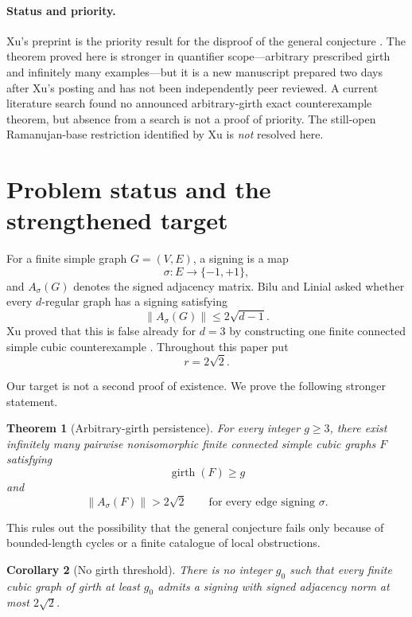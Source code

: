 \documentclass[11pt]{article}
\newtheorem{theorem}{Theorem}[section]
\newtheorem{corollary}[theorem]{Corollary}
\newcommand{\sgn}{\sigma}
\newcommand{\norm}[1]{\left\lVert #1\right\rVert}
\begin{document}
\paragraph{Status and priority.}
Xu's preprint is the priority result for the disproof of the general conjecture \cite{Xu2026}.  The theorem proved here is stronger in quantifier scope---arbitrary prescribed girth and infinitely many examples---but it is a new manuscript prepared two days after Xu's posting and has not been independently peer reviewed.  A current literature search found no announced arbitrary-girth exact counterexample theorem, but absence from a search is not a proof of priority.  The still-open Ramanujan-base restriction identified by Xu is \emph{not} resolved here.

\tableofcontents
\bigskip

\section{Problem status and the strengthened target}

For a finite simple graph $G=(V,E)$, a signing is a map
\[
 \sgn:E\to\{-1,+1\},
\]
and $A_\sgn(G)$ denotes the signed adjacency matrix.  Bilu and Linial asked whether every $d$-regular graph has a signing satisfying
\begin{equation}\label{eq:BL}
 \norm{A_\sgn(G)}\le2\sqrt{d-1}.
\end{equation}
Xu proved that this is false already for $d=3$ by constructing one finite connected simple cubic counterexample \cite{Xu2026}.  Throughout this paper put
\[
 r=2\sqrt2.
\]

Our target is not a second proof of existence.  We prove the following stronger statement.

\begin{theorem}[Arbitrary-girth persistence]\label{thm:main}
For every integer $g\ge3$, there exist infinitely many pairwise nonisomorphic finite connected simple cubic graphs $F$ satisfying
\[
 \operatorname{girth}(F)\ge g
\]
and
\[
 \norm{A_\sgn(F)}>2\sqrt2
 \qquad\text{for every edge signing }\sgn.
\]
\end{theorem}

This rules out the possibility that the general conjecture fails only because of bounded-length cycles or a finite catalogue of local obstructions.

\begin{corollary}[No girth threshold]\label{cor:girth}
There is no integer $g_0$ such that every finite cubic graph of girth at least $g_0$ admits a signing with signed adjacency norm at most $2\sqrt2$.
\end{corollary}
\end{document}
